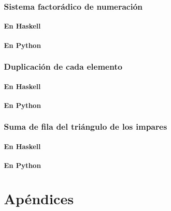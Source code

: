 \documentclass[a4paper,12pt,twoside]{book}
\begin{document}
\section{Sistema factorádico de numeración}
\subsection{En Haskell}
\subsection{En Python}

\section{Duplicación de cada elemento}
\subsection{En Haskell}
\subsection{En Python}

\section{Suma de fila del triángulo de los impares}
\subsection{En Haskell}
\subsection{En Python}

\part*{Apéndices}
\appendix

% 



\end{document}
